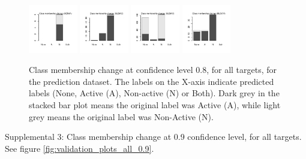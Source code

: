 \documentclass[10pt,article]{memoir}
\begin{document}
\begin{figure}[h!]
\includegraphics[width=0.19\textwidth]{figures/validation_plots/scn5a_0p8_valplot.pdf}
\includegraphics[width=0.19\textwidth]{figures/validation_plots/slc6a2_0p8_valplot.pdf}
\includegraphics[width=0.19\textwidth]{figures/validation_plots/slc6a3_0p8_valplot.pdf}
\includegraphics[width=0.19\textwidth]{figures/validation_plots/slc6a4_0p8_valplot.pdf}
    \caption{Class membership change at confidence level 0.8, for all targets,
    for the prediction dataset.
    The labels on the X-axis indicate predicted labels (None, Active (A),
    Non-active (N) or Both). Dark grey in the stacked bar plot means the
    original label was Active (A), while light grey means the original label
    was Non-Active (N).
    }
    \label{fig:validation_plots_all_0.8}
\end{figure}

Supplemental 3: Class membership change at 0.9 confidence level, for all
targets. See figure \ref{fig:validation_plots_all_0.9}.
\end{document}
